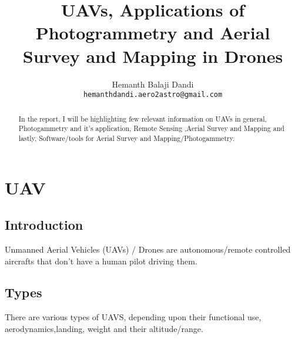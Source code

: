 \documentclass[11pt,twocolumn,letterpaper]{article}
\begin{document}
\title{UAVs, Applications of Photogrammetry and Aerial Survey and Mapping in Drones}

\author{Hemanth Balaji Dandi\\
{\tt\small hemanthdandi.aero2astro@gmail.com}
}


\maketitle

\begin{abstract}
In the report, I will be highlighting few relevant information on UAVs in general, Photogammetry and it's application, Remote Sensing ,Aerial Survey and Mapping and lastly, Software/tools for Aerial Survey and Mapping/Photogammetry.

\end{abstract}

\section{UAV}
\subsection{Introduction}


Unmanned Aerial Vehicles (UAVs) / Drones are autonomous/remote controlled aircrafts that don't have a human pilot driving them. 

\subsection{Types}
There are various types of UAVS, depending upon their functional use, aerodynamics,landing, weight and their altitude/range.
\end{document}
